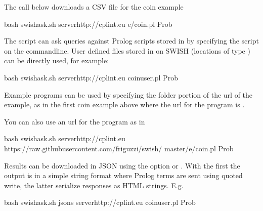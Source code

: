 \documentclass[letterpaper,10pt,english]{sphinxmanual}
\begin{document}
\sphinxAtStartPar
The call below downloads a CSV file for the coin example

\begin{sphinxVerbatim}[commandchars=\\\{\}]
bash swish\PYGZhy{}ask.sh \PYGZhy{}\PYGZhy{}serverhttp://cplint.eu e/coin.pl Prob 
\end{sphinxVerbatim}

\sphinxAtStartPar
The script can ask queries against Prolog scripts stored in  by specifying the script on the commandline.
User defined files stored in  on SWISH (locations of type ) can be directly used, for example:

\begin{sphinxVerbatim}[commandchars=\\\{\}]
bash swish\PYGZhy{}ask.sh \PYGZhy{}\PYGZhy{}serverhttp://cplint.eu coin\PYGZus{}user.pl Prob 
\end{sphinxVerbatim}

\sphinxAtStartPar
Example programs can be used by specifying the folder portion of the url of the example, as in the first coin example above where the url for the program is .

\sphinxAtStartPar
You can also use an url for the program as in

\begin{sphinxVerbatim}[commandchars=\\\{\}]
bash swish\PYGZhy{}ask.sh \PYGZhy{}\PYGZhy{}serverhttp://cplint.eu 
https://raw.githubusercontent.com/friguzzi/swish/
master/e/coin.pl Prob 
\end{sphinxVerbatim}

\sphinxAtStartPar
Results can be downloaded in JSON using the option  or . With the first the output is in a simple string format where Prolog terms are sent using quoted write, the latter serialize responses as HTML strings.
E.g.

\begin{sphinxVerbatim}[commandchars=\\\{\}]
bash swish\PYGZhy{}ask.sh \PYGZhy{}\PYGZhy{}json\PYGZhy{}s \PYGZhy{}\PYGZhy{}serverhttp://cplint.eu 
        coin\PYGZus{}user.pl Prob 
\end{sphinxVerbatim}
\end{document}
